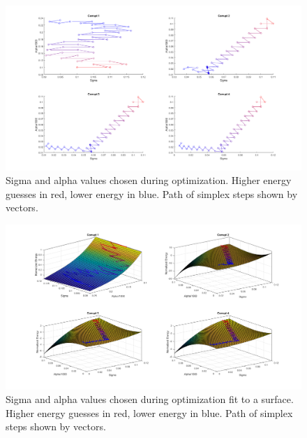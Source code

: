 \documentclass[12pt]{article}
\begin{document}
\begin{figure}[H]
	
	
	
	\includegraphics[width = .9\textwidth]{Figures/TVSigAlphaflat.png}
	\caption{Sigma and alpha values chosen during optimization. Higher energy guesses in red, lower energy in blue. Path of simplex steps shown by vectors.}
	\label{fig:TV_SA_f}
\end{figure}

\begin{figure}[H]
	
	
	
	\includegraphics[width = .9\textwidth]{Figures/TVSigAlphaSurf.png}
	\caption{Sigma and alpha values chosen during optimization fit to a surface. Higher energy guesses in red, lower energy in blue. Path of simplex steps shown by vectors.}
	\label{fig:TV_SA_s}
\end{figure}
\end{document}
